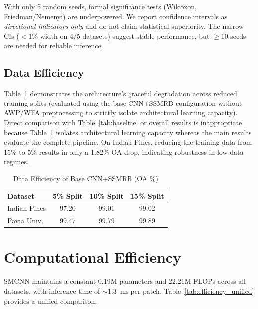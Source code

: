 \documentclass[conference]{IEEEtran}
\begin{document}
With only 5 random seeds, formal significance tests (Wilcoxon, Friedman/Nemenyi) are underpowered. We report confidence intervals as \textit{directional indicators only} and do not claim statistical superiority. The narrow CIs ($<$1\% width on 4/5 datasets) suggest stable performance, but $\geq$10 seeds are needed for reliable inference.

\subsection{Data Efficiency}

Table~\ref{tab:data_eff} demonstrates the architecture's graceful degradation across reduced training splits (evaluated using the base CNN+SSMRB configuration without AWP/WFA preprocessing to strictly isolate architectural learning capacity). Direct comparison with Table~\ref{tab:baseline} or overall results is inappropriate because Table~\ref{tab:data_eff} isolates architectural learning capacity whereas the main results evaluate the complete pipeline. On Indian Pines, reducing the training data from 15\% to 5\% results in only a 1.82\% OA drop, indicating robustness in low-data regimes.

\begin{table}[!h]
\caption{Data Efficiency of Base CNN+SSMRB (OA \%)}
\label{tab:data_eff}
\centering
\begin{tabular}{lccc}
\toprule
\textbf{Dataset} & \textbf{5\% Split} & \textbf{10\% Split} & \textbf{15\% Split} \\
\midrule
Indian Pines & 97.20 & 99.01 & 99.02 \\
Pavia Univ. & 99.47 & 99.79 & 99.89 \\
\bottomrule
\end{tabular}
\end{table}

\section{Computational Efficiency}

SMCNN maintains a constant 0.19M parameters and 22.21M FLOPs across all datasets, with inference time of $\sim$1.3~ms per patch. Table~\ref{tab:efficiency_unified} provides a unified comparison.
\end{document}
